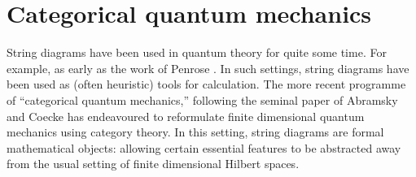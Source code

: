 \section{Categorical quantum mechanics}
\label{sec:cqm}
%
%
%
%
%
%
%
%
%
%
%
String diagrams have been used in quantum theory for quite some time.  For example, as early as the work of Penrose \cite{penrosei}.  In such settings, string diagrams have been used as (often heuristic) tools for calculation. The more recent programme of ``categorical quantum mechanics,'' following the seminal paper of Abramsky and Coecke \cite{abramsky} has endeavoured to reformulate finite dimensional quantum mechanics using category theory.  In this setting,  string diagrams are formal mathematical objects: allowing certain essential features to be abstracted away from the usual setting of finite dimensional Hilbert spaces.

